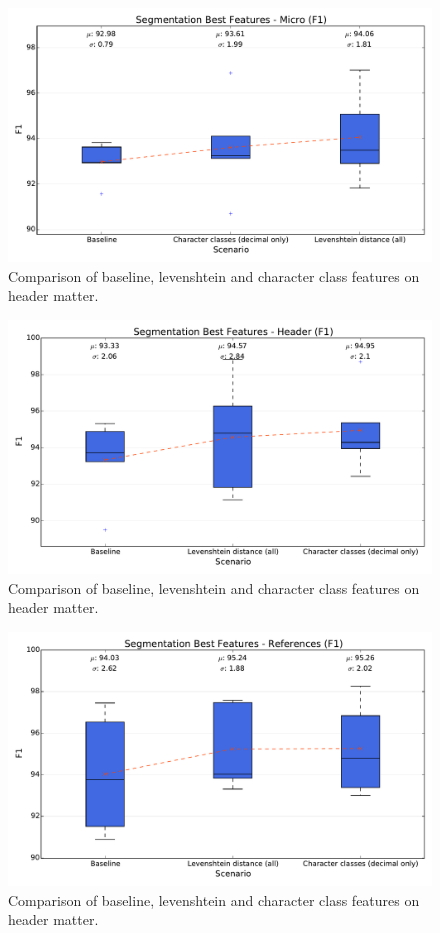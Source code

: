 \begin{figure}[h]
\center
\includegraphics[width=5.5in]{Figures/micro_segmentation.pdf}
\caption{Comparison of baseline, levenshtein and character class features on header matter.}
\label{fig:micro}
\end{figure}


\begin{figure}[h]
\center
\includegraphics[width=5.5in]{Figures/header.pdf}
\caption{Comparison of baseline, levenshtein and character class features on header matter.}
\label{fig:header}
\end{figure}

\begin{figure}[h]
\center
\includegraphics[width=5.5in]{Figures/references.pdf}
\caption{Comparison of baseline, levenshtein and character class features on header matter.}
\label{fig:references}
\end{figure}
